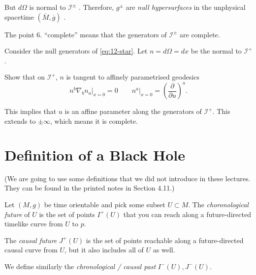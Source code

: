But $d\Omega$  is normal to $\mathscr{I}^{\pm}$ . 
Therefore, $g^{\pm}$  are \emph{null hypersurfaces} in the unphysical spacetime $(\overline{M}{}, \overline{g}{})$ .

The point $6.$  ``complete'' means that the generators of $\mathscr{I}^{\pm}$  are complete.
\begin{example}[]
  Consider the null generators of \eqref{eq:12-star}. Let $n = d\Omega = dx$ be the normal to  $\mathscr{I}^+$ .
  \begin{exercise}
    Show that on $\mathscr{I}^+$, $n$ is tangent to affinely parametrised geodesics
    \begin{equation}
      n^b \nabla_b n_a \rvert_{x = 0} = 0 \qquad n^a \rvert_{x = 0} = \left( \frac{\partial }{\partial u} \right)^a.
    \end{equation}
  \end{exercise}
  This implies that $u$ is an affine parameter along the generators of $\mathscr{I}^+$. This extends to $\pm \infty$, which means it is complete.
\end{example}

\section{Definition of a Black Hole}%
\label{sec:definition_of_a_black_hole}

(We are going to use some definitions that we did not introduce in these lectures. They can be found in the printed notes in Section 4.11.)
\begin{definition}[]
  Let $(M, g)$ be time orientable and pick some subset $U \subset M$.
  The \emph{choronological future} of $U$ is the set of points $I^+(U)$ that you can reach along a future-directed timelike curve from $U$ to $p$.
\end{definition}
\begin{definition}[]
  The \emph{causal future} $J^+(U)$ is the set of points reachable along a future-directed causal curve from $U$, but it also includes all of $U$ as well.
\end{definition}
We define similarly the \emph{chronological / causal past} $I^-(U), J^-(U)$.
\begin{figure}[tbhp]
  \centering
  \def\svgwidth{0.4\columnwidth}
  
  \caption{}
  \label{fig:l12f1}
\end{figure}

